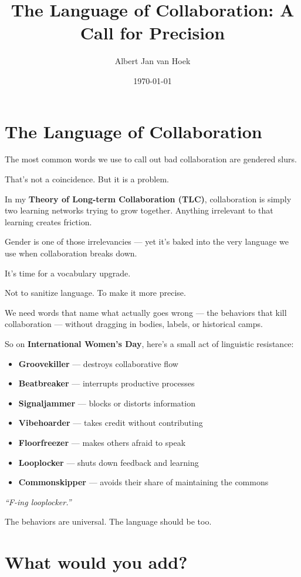 \documentclass{article}
\title{The Language of Collaboration: A Call for Precision}
\author{Albert Jan van Hoek}
\date{\today}
\begin{document}
\maketitle

\section*{The Language of Collaboration}

The most common words we use to call out bad collaboration are gendered slurs.

That’s not a coincidence. But it is a problem.

In my \textbf{Theory of Long-term Collaboration (TLC)}, collaboration is simply two learning networks trying to grow together. Anything irrelevant to that learning creates friction.

Gender is one of those irrelevancies — yet it’s baked into the very language we use when collaboration breaks down.

It’s time for a vocabulary upgrade.

Not to sanitize language. To make it more precise.

We need words that name what actually goes wrong — the behaviors that kill collaboration — without dragging in bodies, labels, or historical camps.

So on \textbf{International Women’s Day}, here’s a small act of linguistic resistance:

\begin{itemize}
    \item \textbf{Groovekiller} — destroys collaborative flow
    \item \textbf{Beatbreaker} — interrupts productive processes
    \item \textbf{Signaljammer} — blocks or distorts information
    \item \textbf{Vibehoarder} — takes credit without contributing
    \item \textbf{Floorfreezer} — makes others afraid to speak
    \item \textbf{Looplocker} — shuts down feedback and learning
    \item \textbf{Commonskipper} — avoids their share of maintaining the commons
\end{itemize}

\textit{``F-ing looplocker.''}

The behaviors are universal. The language should be too.

\section*{What would you add?}
\end{document}
